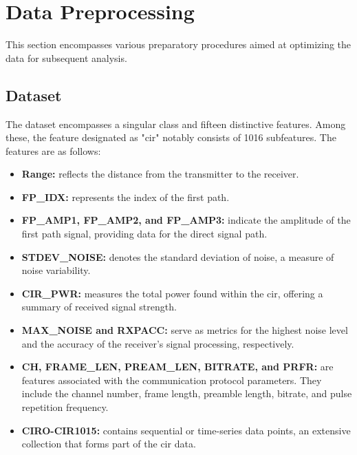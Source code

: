 \section{Data Preprocessing}\label{data_preprocessing}

This section encompasses various preparatory procedures aimed at optimizing the data for subsequent analysis. 

\subsection{Dataset}\label{dataset_given}

The dataset encompasses a singular class and fifteen distinctive features. Among these, the feature designated as "\acrshort{cir}" notably consists of 1016 subfeatures. The features are as follows:

\begin{itemize}
    \item \textbf{Range:} reflects the distance from the transmitter to the receiver.
    \item \textbf{FP\_IDX:} represents the index of the first path.
    \item \textbf{FP\_AMP1, FP\_AMP2, and FP\_AMP3:} indicate the amplitude of the first path signal, providing data for the direct signal path.
    \item \textbf{STDEV\_NOISE:} denotes the standard deviation of noise, a measure of noise variability.
    \item \textbf{CIR\_PWR:} measures the total power found within the \acrshort{cir}, offering a summary of received signal strength.
    \item \textbf{MAX\_NOISE and RXPACC:} serve as metrics for the highest noise level and the accuracy of the receiver's signal processing, respectively.
    \item \textbf{CH, FRAME\_LEN, PREAM\_LEN, BITRATE, and PRFR:} are features associated with the communication protocol parameters. They include the channel number, frame length, preamble length, bitrate, and pulse repetition frequency.
    \item \textbf{CIRO-CIR1015:} contains sequential or time-series data points, an extensive collection that forms part of the \acrshort{cir} data.
\end{itemize}


